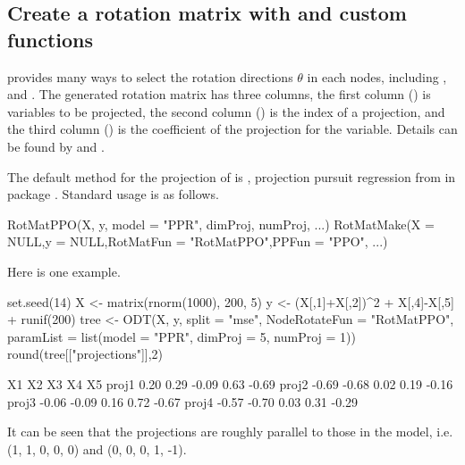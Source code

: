 \subsection[Create a rotation matrix with RotMat* and user-defined functions]{Create a rotation matrix with  and custom functions} \label{user-defined}

 provides many ways to select the rotation directions $ \theta $ in each nodes, including  ,  and . The generated rotation matrix has three columns, the first column () is variables to be projected, the second column () is the index of a projection, and the third column () is the coefficient of the projection for the variable. Details can be found by  and . %

The default method for the projection of  is , projection pursuit regression from  in  package  \citep{friedman1981projection}. %
Standard usage is as follows.
\begin{example}
RotMatPPO(X, y, model = "PPR", dimProj, numProj, ...)
RotMatMake(X = NULL,y = NULL,RotMatFun = "RotMatPPO",PPFun = "PPO", ...)
\end{example}
Here is one example.
\begin{example}
set.seed(14)
X <- matrix(rnorm(1000), 200, 5)
y <- (X[,1]+X[,2])^2 + X[,4]-X[,5] +  runif(200)
tree <- ODT(X, y, split = "mse", NodeRotateFun = "RotMatPPO",
  paramList = list(model = "PPR", dimProj = 5, numProj = 1))
round(tree[["projections"]],2)
\end{example}
\begin{example}
         X1    X2    X3   X4    X5
proj1  0.20  0.29 -0.09 0.63 -0.69
proj2 -0.69 -0.68  0.02 0.19 -0.16
proj3 -0.06 -0.09  0.16 0.72 -0.67
proj4 -0.57 -0.70  0.03 0.31 -0.29
\end{example}
It can be seen that  the projections are roughly parallel to those in the model, i.e. (1, 1, 0, 0, 0) and (0, 0, 0, 1, -1).  

